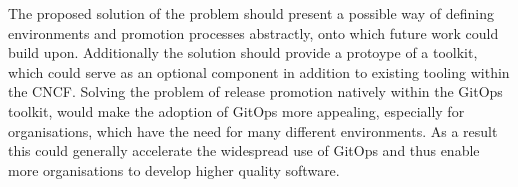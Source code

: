 
\noindent
%
The proposed solution of the problem should
present a possible way of defining environments and promotion processes abstractly,
onto which future work could build upon.
%
Additionally the solution should
provide a protoype of a toolkit,
which could serve as an optional component
in addition to existing tooling within the CNCF.
%
Solving the problem of release promotion natively within the GitOps toolkit,
would make the adoption of GitOps more appealing,
especially for organisations, which have the need for many different environments.
%
As a result
this could generally accelerate the widespread use of GitOps
and thus enable more organisations to develop higher quality software.
%














